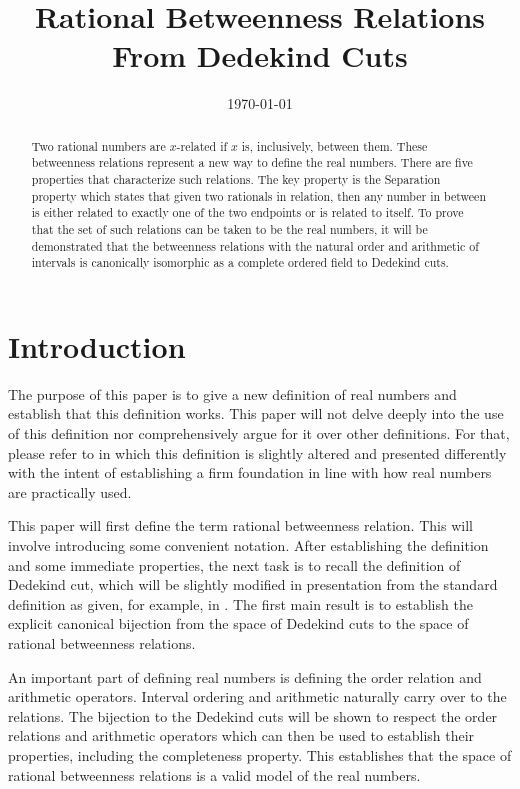 \documentclass[12pt]{article}
\title{Rational Betweenness Relations From Dedekind Cuts}
\date{\today}
\begin{document}
\maketitle
\begin{abstract}
Two rational numbers are $x$-related if $x$ is, inclusively, between them. These betweenness relations represent a new way to define the real numbers. There are five properties that characterize such relations. The key property is the Separation property which states that given two rationals in relation, then any number in between is either related to exactly one of the two endpoints or is related to itself. To prove that the set of such relations can be taken to be the real numbers, it will be demonstrated that the betweenness relations with the natural order and arithmetic of intervals is canonically isomorphic as a complete ordered field to Dedekind cuts. 
\end{abstract}

\section{Introduction}

The purpose of this paper is to give a new definition of real numbers and establish that this definition works. This paper will not delve deeply into the use of this definition nor comprehensively argue for it over other definitions. For that, please refer to \cite{taylor23main} in which this definition is slightly altered and presented differently with the intent of establishing a firm foundation in line with how real numbers are practically used.

This paper will first define the term rational betweenness relation. This will involve introducing some convenient notation. After establishing the definition and some immediate properties, the next task is to recall the definition of Dedekind cut, which will be slightly modified in presentation from the standard definition as given, for example, in \cite{rudin}. The first main result is to establish the explicit canonical bijection from the space of Dedekind cuts to the space of rational betweenness relations. 

An important part of defining real numbers is defining the order relation and arithmetic operators. Interval ordering and arithmetic naturally carry over to the relations. The bijection to the Dedekind cuts will be shown to respect the order relations and arithmetic operators which can then be used to establish their properties, including the completeness property.   This establishes that the space of rational betweenness relations is a valid model of the real numbers. 
\end{document}
